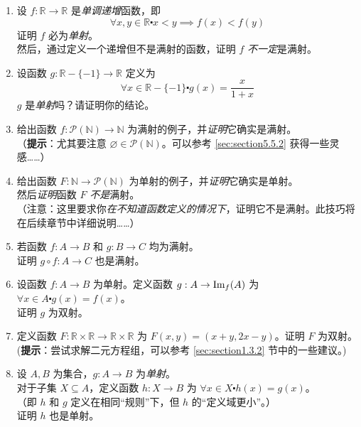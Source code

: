 \begin{enumerate}[label=(\arabic*)]
    \item 设 $f : \mathbb{R} \to \mathbb{R}$ 是\emph{单调递增}函数，即
        \[\forall x, y \in \mathbb{R} \centerdot x < y \implies f(x) < f(y)\]
        证明 $f$ 必为\emph{单射}。\\
        然后，通过定义一个递增但不是满射的函数，证明 $f$ \emph{不一定}是满射。
    \item 设函数 $g : \mathbb{R} - \{-1\} \to \mathbb{R}$ 定义为 
        \[\forall x \in \mathbb{R} - \{-1\} \centerdot g(x) = \frac{x}{1+x}\]
        $g$ 是\emph{单射}吗？请证明你的结论。
    \item 给出函数 $f : \mathcal{P}(\mathbb{N}) \to \mathbb{N}$ 为满射的例子，并\emph{证明}它确实是满射。\\
        （\textbf{提示}：尤其要注意 $\varnothing \in \mathcal{P}(\mathbb{N})$。可以参考 \ref{sec:section5.5.2} 获得一些灵感……）
    \item 给出函数 $F : \mathbb{N} \to \mathcal{P}(\mathbb{N})$ 为单射的例子，并\emph{证明}它确实是单射。\\
        然后\emph{证明}函数 $F$ \emph{不是}满射。\\
        （注意：这里要求你\emph{在不知道函数定义的情况下}，证明它不是满射。此技巧将在后续章节中详细说明……）\label{exc:exercises7.4.4}
    \item 若函数 $f : A \to B$ 和 $g : B \to C$ 均为满射。\\
    证明 $g \circ f:A \to C$ 也是满射。
    \item 设函数 $f : A \to B$ 为单射。定义函数 $g : A \to \text{Im}_f (A)$ 为 $\forall x \in A \centerdot g(x) = f(x)$。\\
    证明 $g$ 为双射。
    \item 定义函数 $F:\mathbb{R} \times \mathbb{R} \to \mathbb{R} \times \mathbb{R}$ 为 $F(x, y) = (x+y, 2x-y)$。证明 $F$ 为双射。\\
        (\textbf{提示}：尝试求解二元方程组，可以参考 \ref{sec:section1.3.2} 节中的一些建议。)
    \item 设 $A, B$ 为集合，$g: A \to B$ 为\emph{单射}。\\
        对于子集 $X \subseteq A$，定义函数 $h : X \to B$ 为 $\forall x \in X \centerdot h(x) = g(x)$。\\
        （即 $h$ 和 $g$ 定义在相同``规则''下，但 $h$ 的``定义域更小''。）\\
        证明 $h$ 也是单射。
\end{enumerate}